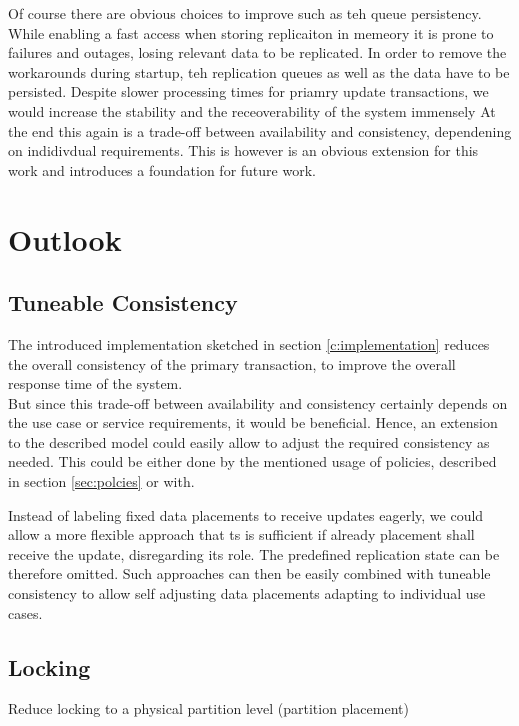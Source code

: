 Of course there are obvious choices to improve such as teh queue persistency. While enabling a fast access when storing replicaiton in memeory it is prone to failures and outages,
losing relevant data to be replicated. In order to remove the workarounds during startup, teh replication queues as well as the data have to be persisted.
Despite slower processing times for priamry update transactions, we would increase the stability and the receoverability of the system immensely 
At the end this again is a trade-off between availability and consistency, dependening on indidivdual requirements.
This is however is an obvious extension for this work and introduces a foundation for future work.


\section{Outlook}

\subsection{Tuneable Consistency}
The introduced implementation sketched in section \ref{c:implementation} reduces the overall consistency of the primary transaction,
to improve the overall response time of the system.\\ 
But since this trade-off between availability and consistency certainly depends on the use case or service requirements, it would be beneficial.
Hence, an extension to the described model could easily allow to adjust the required consistency as needed. 
This could be either done by the mentioned usage of policies, described in section \ref{sec:polcies} or with.

Instead of labeling fixed data placements to receive updates eagerly, we could allow a more flexible approach that ts is sufficient if already placement 
shall receive the update, disregarding its role. The predefined replication state can be therefore omitted. 
Such approaches can then be easily combined with tuneable consistency to allow self adjusting data placements  adapting to individual use cases.

\subsection{Locking}
Reduce locking to a physical partition level  (partition placement)

